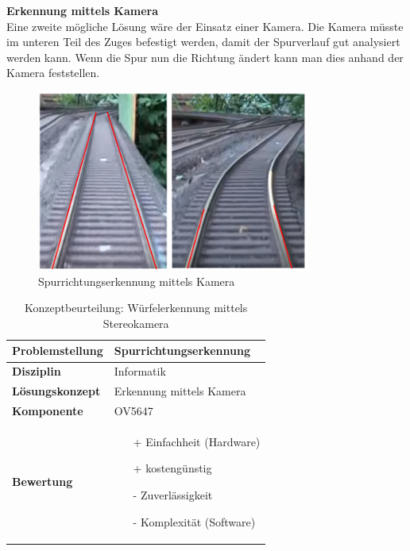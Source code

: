\documentclass[../../../main.tex]{subfiles}
\begin{document}
    \vspace{0.5cm}
    \textbf{Erkennung mittels Kamera}\\
    Eine zweite mögliche Lösung wäre der Einsatz einer Kamera. Die Kamera müsste im unteren Teil des Zuges befestigt
    werden, damit der Spurverlauf gut analysiert werden kann. Wenn die Spur nun die Richtung ändert kann man dies 
    anhand der Kamera feststellen.\\

    \begin{figure}[H] %
        \centering
        \includegraphics[width=0.8\textwidth]{spurrichtung_Kamera.png}
        \caption{Spurrichtungserkennung mittels Kamera}
    \end{figure}

    \begin{flushleft}
        \begin{table}[H]
        \begin{tabular}{ | l | p{11cm} |}
        \hline
        \textbf{Problemstellung} & Spurrichtungserkennung \\ \hline
        \textbf{Disziplin} & Informatik \\ \hline
        \textbf{Lösungskonzept} & Erkennung mittels Kamera \\ \hline
        \textbf{Komponente} & OV5647 \\ \hline
        \textbf{Bewertung} &  \begin{itemize}
                                \item[+] Einfachheit (Hardware)
                                \item[+] kostengünstig
                                \item[-] Zuverlässigkeit
                                \item[-] Komplexität (Software)   
                              \end{itemize} \\ \hline
        \end{tabular}
        \caption{Konzeptbeurteilung: Würfelerkennung mittels Stereokamera}
        \label{tab:konzept_wurfel_Stereokamera}
    \end{table}
    \end{flushleft}
\end{document}
